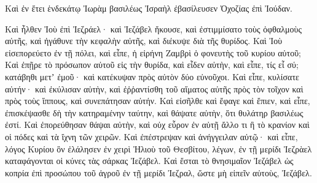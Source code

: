 {\par }{\PP {}Καὶ ἐν ἔτει ἑνδεκάτῳ Ἰωρὰμ βασιλέως Ἰσραὴλ ἐβασίλευσεν Ὀχοζίας ἐπὶ Ἰούδαν.
\par }{\PP {}Καὶ ἦλθεν Ἰοὺ ἐπὶ Ἰεζράελ· καὶ Ἰεζάβελ ἤκουσε, καὶ ἐστιμμίσατο τοὺς ὀφθαλμοὺς αὐτῆς, καὶ ἠγάθυνε τὴν κεφαλὴν αὐτῆς, καὶ διέκυψε διὰ τῆς θυρίδος.
Καὶ Ἰοὺ εἰσεπορεύετο ἐν τῇ πόλει, καὶ εἶπε, ἡ εἰρήνη Ζαμβρὶ ὁ φονευτὴς τοῦ κυρίου αὐτοῦ;
Καὶ ἐπῇρε τὸ πρόσωπον αὐτοῦ εἰς τὴν θυρίδα, καὶ εἶδεν αὐτὴν, καὶ εἶπε, τίς εἶ σύ; κατάβηθι μετʼ ἐμοῦ· καὶ κατέκυψαν πρὸς αὐτὸν δύο εὐνοῦχοι.
Καὶ εἶπε, κυλίσατε αὐτήν· καὶ ἐκύλισαν αὐτὴν, καὶ ἐῤῥαντίσθη τοῦ αἵματος αὐτῆς πρὸς τὸν τοῖχον καὶ πρὸς τοὺς ἵππους, καὶ συνεπάτησαν αὐτήν.
Καὶ εἰσῆλθε καὶ ἔφαγε καὶ ἔπιεν, καὶ εἶπε, ἐπισκέψασθε δὴ τὴν κατηραμένην ταύτην, καὶ θάψατε αὐτὴν, ὅτι θυλάτηρ βασιλέως ἐστί.
Καὶ ἐπορεύθησαν θάψαι αὐτὴν, καὶ οὐχ εὗρον ἐν αὐτῇ ἄλλο τι ἢ τὸ κρανίον καὶ οἱ πόδες καὶ τὰ ἴχνη τῶν χειρῶν.
Καὶ ἐπέστρεψαν καὶ ἀνήγγειλαν αὐτῷ· καὶ εἶπε, λόγος Κυρίου ὃν ἐλάλησεν ἐν χειρὶ Ἠλιοὺ τοῦ Θεσβίτου, λέγων, ἐν τῇ μερίδι Ἰεζρὰελ καταφάγονται οἱ κύνες τὰς σάρκας Ἰεζάβελ.
Καὶ ἔσται τὸ θνησιμαῖον Ἰεζάβελ ὡς κοπρία ἐπὶ προσώπου τοῦ ἀγροῦ ἐν τῇ μερίδι Ἰεζραλ, ὥστε μὴ εἰπεῖν αὐτοὺς, Ἰεζάβελ.

}
